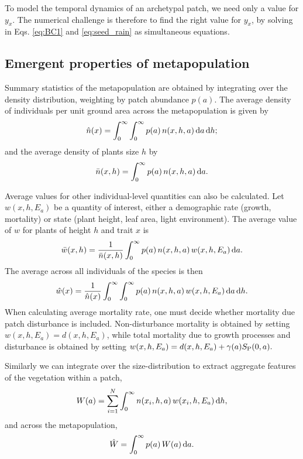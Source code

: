\documentclass[10pt,twoside]{article}
\begin{document}
To model the temporal dynamics of an archetypal patch, we need only a
value for \(y_x\). The numerical challenge is therefore to find the
right value for \(y_x\), by solving in Eqs. \ref{eq:BC1} and
\ref{eq:seed_rain} as simultaneous equations.

\subsection{Emergent properties of
metapopulation}\label{emergent-properties-of-metapopulation}

Summary statistics of the metapopulation are obtained by integrating
over the density distribution, weighting by patch abundance \(p(a)\).
The average density of individuals per unit ground area across the metapopulation is given by
\begin{equation}
  \hat{n}(x) = \int_{0}^{\infty} \int_{0}^{\infty}p(a) \, n(x,h,a) \, {\rm d}a \, {\rm d}h;
\end{equation}
and the average density of plants size \(h\) by
\begin{equation}
  \bar{n}(x,h) = \int_{0}^{\infty}p(a) \, n(x,h,a) \, {\rm d}a.
\end{equation}

Average values for other individual-level quantities can also be calculated. 
Let
\(w(x, h, E_a)\) be a quantity of interest, either a demographic rate 
(growth, mortality) or state (plant height, leaf area, light environment). 
The average value of \(w\) for plants of height $h$ and trait $x$ is
\begin{equation}\bar{w}(x,h) = \frac1{\bar{n}(x,h)}\int_{0}^{\infty}p(a)  \, n(x,h,a) \, w(x,h,E_a)\, {\rm d}a.
\end{equation}
The average across all individuals of the species is then
\begin{equation}
  \hat{w}(x) = \frac1{\hat{n}(x) }\int_{0}^{\infty} \int_{0}^{\infty}p(a)  \, n(x,h,a) \, w(x,h,E_a)\, {\rm d}a \, {\rm d}h.
\end{equation}
When calculating average mortality rate, one must decide whether
mortality due patch disturbance is included. Non-disturbance mortality
is obtained by setting \(w(x,h, E_a) = d(x,h,E_a)\), while total
mortality due to growth processes and disturbance is obtained by setting
\(w(x,h, E_a) = d(x,h,E_a)+ \gamma(a) S_{\rm P}(0,a).\)

Similarly we can integrate over the size-distribution to extract aggregate 
features of the vegetation within a patch,
\begin{equation}
  W(a) = \sum_{i=1}^{N} \int_{0}^{\infty} n(x_i,h,a) \, w(x_i,h,E_a) \, {\rm d}h,
\end{equation}
and across the metapopulation,
\begin{equation}
  \hat{W} = \int_{0}^{\infty} p(a) \, W(a) \, {\rm d}a.
\end{equation}
\end{document}
